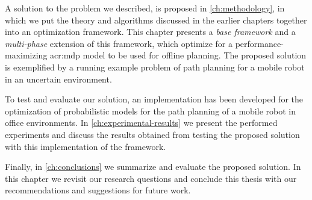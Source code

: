 A solution to the problem we described, is proposed in \autoref{ch:methodology}, in which we put the theory and algorithms discussed in the earlier chapters together into an optimization framework.
This chapter presents a \textit{base framework} and a \textit{multi-phase} extension of this framework, which optimize for a performance-maximizing \acrshort{acr:mdp} model to be used for offline planning.
The proposed solution is exemplified by a running example problem of path planning for a mobile robot in an uncertain environment.

To test and evaluate our solution, an implementation has been developed for the optimization of probabilistic models for the path planning of a mobile robot in office environments.
In \autoref{ch:experimental-results} we present the performed experiments and discuss the results obtained from testing the proposed solution with this implementation of the framework.

Finally, in \autoref{ch:conclusions} we summarize and evaluate the proposed solution. In this chapter we revisit our research questions and conclude this thesis with our recommendations and suggestions for future work.

%
